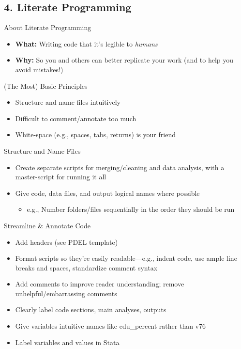 \documentclass[12pt, compress]{beamer} %
\renewcommand{\texttt}[2][ceruleanblue]{\textcolor{#1}{\ttfamily #2}}%
\let\noteitem\item %
\renewcommand{\item}{ 
	\noteitem\vspace{\fill}
	}
\begin{document}
	
\subsection{4. Literate Programming}	

	\begin{frame}{About Literate Programming}
		\begin{itemize}
			\item \textbf{What:} Writing code that it's legible to \textit{humans}
			\item \textbf{Why:} So you and others can better replicate your work (and to help you avoid mistakes!)
		\end{itemize}
	\end{frame}
	
	\begin{frame}{(The Most) Basic Principles}
		\begin{itemize}
			\item Structure and name files intuitively
			\item Difficult to comment/annotate too much
			\item White-space (e.g., spaces, tabs, returns) is your friend
		\end{itemize}
	\end{frame}
	
	\begin{frame}{Structure and Name Files}
 		
 		\begin{itemize}
 			\item	 Create separate scripts for merging/cleaning and data analysis, with a master-script for running it all
 			\item Give code, data files, and output logical names where possible 
 			\begin{itemize}
 				\item e.g., Number folders/files sequentially in the order they should be run
 			\end{itemize}
 		\end{itemize}
 	\end{frame}
 
	 \begin{frame}{Streamline \& Annotate Code}
	 	
	 	\begin{itemize}
	 		\item Add headers (see PDEL template)
	 		\item Format scripts so they're easily readable---e.g., indent code, use ample line breaks and spaces, standardize comment syntax
	 		\item Add comments to improve reader understanding; remove unhelpful/embarrassing comments
			\item Clearly label code sections, main analyses, outputs 
			\item Give variables intuitive names like \texttt{edu\_percent} rather than \texttt{v76}
			\item Label variables and values in Stata
			\end{itemize}
	 \end{frame}
	 	 
\end{document}
